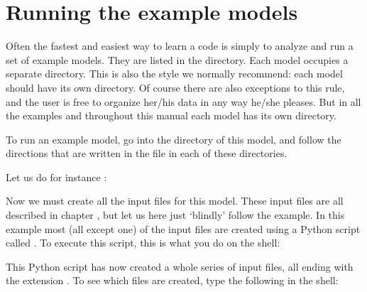 \documentclass[letterpaper,10pt,english]{sphinxmanual}
\begin{document}
\section{Running the example models}
\label{\detokenize{basicstructure:running-the-example-models}}\label{\detokenize{basicstructure:sec-example-models}}
Often the fastest and easiest way to learn a code is simply to analyze and run a
set of example models. They are listed in the  directory. Each model
occupies a separate directory. This is also the style we normally recommend:
each model should have its own directory. Of course there are also exceptions to
this rule, and the user is free to organize her/his data in any way he/she
pleases. But in all the examples and throughout this manual each model has its
own directory.

To run an example model, go into the directory of this model, and follow the
directions that are written in the  file in each of these
directories. 

Let us do for instance :

\begin{sphinxVerbatim}[commandchars=\\\{\}]
 
\end{sphinxVerbatim}

Now we must create all the input files for this model. These input files are
all described in chapter {\hyperref[\detokenize{inputoutputfiles:chap-input-files}]{}}, but let us here just
‘blindly’ follow the example. In this example most (all except one) of the
input files are created using a Python script called .
To execute this script, this is what you do on the shell:

\begin{sphinxVerbatim}[commandchars=\\\{\}]
 
\end{sphinxVerbatim}

This Python script has now created a whole series
of input files, all ending with the extension . To see which
files are created, type the following in the shell:
\end{document}

